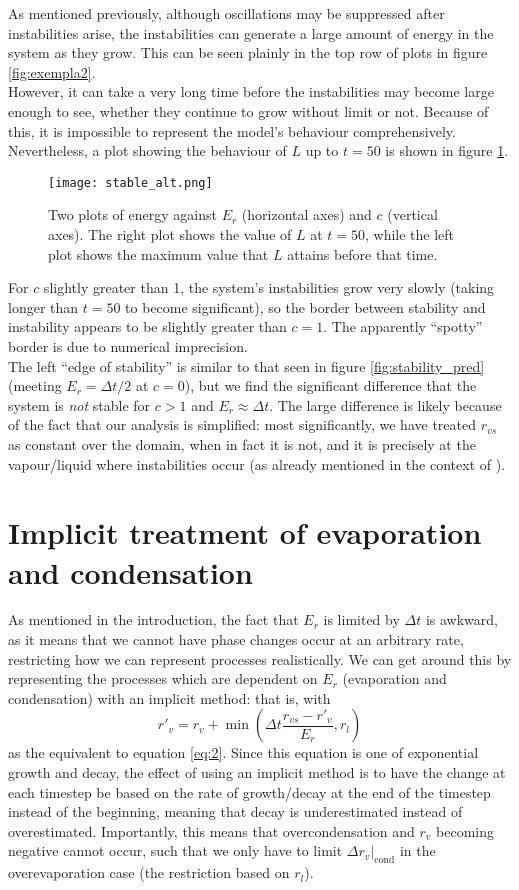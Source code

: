 \documentclass[11pt]{article}
\begin{document}
As mentioned previously, although oscillations may be suppressed after instabilities arise, the instabilities can generate a large amount of energy in the system as they grow. This can be seen plainly in the top row of plots in figure \ref{fig:exempla2}. \\
However, it can take a very long time before the instabilities may become large enough to see, whether they continue to grow without limit or not. Because of this, it is impossible to represent the model's behaviour comprehensively. Nevertheless, a plot showing the behaviour of $L$ up to $t=50$ is shown in figure \ref{fig:stable_alt}.
\begin{figure}[H]
\centering
\texttt{[image: stable\_alt.png]}
\caption{Two plots of energy against $E_r$ (horizontal axes) and $c$ (vertical axes). The right plot shows the value of $L$ at $t=50$, while the left plot shows the maximum value that $L$ attains before that time.}
\label{fig:stable_alt}
\end{figure}
For $c$ slightly greater than 1, the system's instabilities grow very slowly (taking longer than $t=50$ to become significant), so the border between stability and instability appears to be slightly greater than $c=1$. The apparently ``spotty'' border is due to numerical imprecision. \\
The left ``edge of stability'' is similar to that seen in figure \ref{fig:stability_pred} (meeting $E_r=\Delta t/2$ at $c=0$), but we find the significant difference that the system is \emph{not} stable for $c>1$ and $E_r\approx\Delta t$. The large difference is likely because of the fact that our analysis is simplified: most significantly, we have treated $r_{vs}$ as constant over the domain, when in fact it is not, and it is precisely at the vapour/liquid where instabilities occur (as already mentioned in the context of \citet{GS1990}).

\section{Implicit treatment of evaporation and condensation}
As mentioned in the introduction, the fact that $E_r$ is limited by $\Delta t$ is awkward, as it means that we cannot have phase changes occur at an arbitrary rate, restricting how we can represent processes realistically. We can get around this by representing the processes which are dependent on $E_r$ (evaporation and condensation) with an implicit method: that is, with
\[
r'_v = r_v + \min\left(\Delta t\frac{r_{vs} - r'_v}{E_r},r_l\right)
\]
as the equivalent to equation \ref{eq:2}. Since this equation is one of exponential growth and decay, the effect of using an implicit method is to have the change at each timestep be based on the rate of growth/decay at the end of the timestep instead of the beginning, meaning that decay is underestimated instead of overestimated. Importantly, this means that overcondensation and $r_v$ becoming negative cannot occur, such that we only have to limit $\Delta r_v|_{\text{cond}}$ in the overevaporation case (the restriction based on $r_l$).
\end{document}
